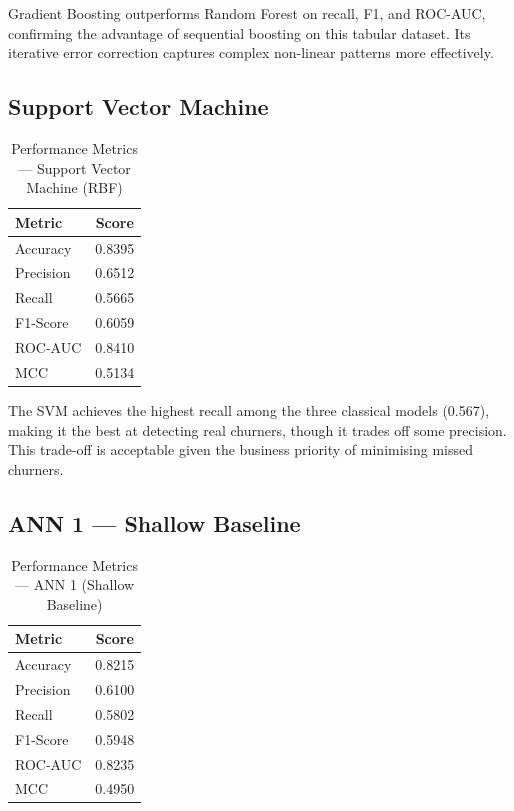 Gradient Boosting outperforms Random Forest on recall, F1, and ROC-AUC, confirming the advantage of sequential boosting on this tabular dataset. Its iterative error correction captures complex non-linear patterns more effectively.

\subsection{Support Vector Machine}

\begin{table}[H]
    \centering
    \caption{Performance Metrics — Support Vector Machine (RBF)}
    \label{tab:svm_metrics}
    \vspace{3mm}
    \begin{tabular}{|l|c|}
        \hline
        \textbf{Metric} & \textbf{Score} \\
        \hline
        Accuracy   & 0.8395 \\
        \hline
        Precision  & 0.6512 \\
        \hline
        Recall     & 0.5665 \\
        \hline
        F1-Score   & 0.6059 \\
        \hline
        ROC-AUC    & 0.8410 \\
        \hline
        MCC        & 0.5134 \\
        \hline
    \end{tabular}
\end{table}

The SVM achieves the highest recall among the three classical models (0.567), making it the best at detecting real churners, though it trades off some precision. This trade-off is acceptable given the business priority of minimising missed churners.

\subsection{ANN 1 — Shallow Baseline}

\begin{table}[H]
    \centering
    \caption{Performance Metrics — ANN 1 (Shallow Baseline)}
    \label{tab:ann1_metrics}
    \vspace{3mm}
    \begin{tabular}{|l|c|}
        \hline
        \textbf{Metric} & \textbf{Score} \\
        \hline
        Accuracy   & 0.8215 \\
        \hline
        Precision  & 0.6100 \\
        \hline
        Recall     & 0.5802 \\
        \hline
        F1-Score   & 0.5948 \\
        \hline
        ROC-AUC    & 0.8235 \\
        \hline
        MCC        & 0.4950 \\
        \hline
    \end{tabular}
\end{table}

